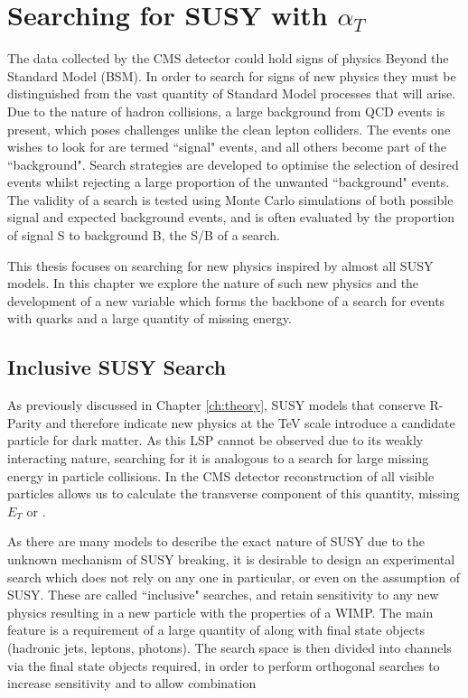 \chapter{Searching for SUSY with $\alpha_{T}$}


The data collected by the CMS detector could hold signs of physics Beyond the Standard Model (BSM). In order to search for signs of new physics they must be distinguished from the vast quantity of Standard Model processes that will arise. Due to the nature of hadron collisions, a large background from QCD events is present, which poses challenges unlike the clean lepton colliders. The events one wishes to look for are termed ``signal" events, and all others become part of the ``background". Search strategies are developed to optimise the selection of desired events whilst rejecting a large proportion of the unwanted ``background" events. The validity of a search is tested using Monte Carlo simulations of both possible signal and expected background events, and is often evaluated by the proportion of signal S to background B, the S/B of a search. 

This thesis focuses on searching for new physics inspired by almost all SUSY models. In this chapter we explore the nature of such new physics and the development of a new variable \alt which forms the backbone of a search for events with quarks and a large quantity of missing energy. 

\section{Inclusive SUSY Search}

As previously discussed in Chapter \ref{ch:theory}, SUSY models that conserve R-Parity and therefore indicate new physics at the TeV scale introduce a candidate particle for dark matter. As this LSP cannot be observed due to its weakly interacting nature, searching for it is analogous to a search for large missing energy in particle collisions. In the CMS detector reconstruction of all visible particles allows us to calculate the transverse component of this quantity, missing $E_{T}$ or \met. 

As there are many models to describe the exact nature of SUSY due to the unknown mechanism of SUSY breaking, it is desirable to design an experimental search which does not rely on any one in particular, or even on the assumption of SUSY. These are called ``inclusive" searches, and retain sensitivity to any new physics resulting in a new particle with the properties of a WIMP. The main feature is a requirement of a large quantity of \met along with final state objects (hadronic jets, leptons, photons). The search space is then divided into channels via the final state objects required, in order to perform orthogonal searches to increase sensitivity and to allow combination 

